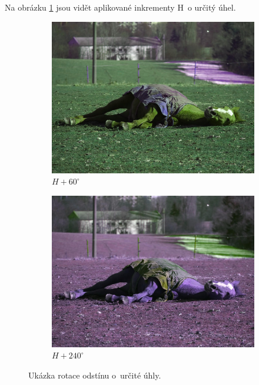 \documentclass[11pt, a4paper, titlepage]{article}
\begin{document}
Na obrázku \ref{fig:huerotate-res} jsou vidět aplikované inkrementy H~o určitý úhel.
\begin{figure}[h]
    \centering
    \begin{subfigure}[t]{0.4\textwidth}
        \vskip 0pt
        \includegraphics[width=1.0\textwidth]{horse_hue_60.jpg}
        \caption{$H + 60^\circ$}
    \end{subfigure}
    \hspace{1cm}
    \begin{subfigure}[t]{0.4\textwidth}
        \vskip 0pt
        \includegraphics[width=1.0\textwidth]{horse_hue_240.jpg}
        \caption{$H + 240^\circ$}
    \end{subfigure}
    \caption{Ukázka rotace odstínu o~určité úhly.}
    \label{fig:huerotate-res}
\end{figure}
\end{document}
